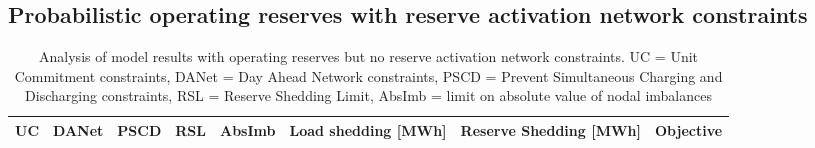 \documentclass[number,times]{elsarticle}
\begin{document}
\subsection{Probabilistic operating reserves with reserve activation network constraints}

\begin{table}[ht]
    \centering
    \footnotesize
    \begin{tabular}{cccccccc}
        \toprule
        UC  & DANet & PSCD & RSL & AbsImb & Load shedding [MWh] & Reserve Shedding [MWh] & Objective \\
        \midrule
        \bottomrule
    \end{tabular}
    \caption{Analysis of model results with operating reserves but no reserve activation network constraints. UC = Unit Commitment constraints, DANet = Day Ahead Network constraints, PSCD = Prevent Simultaneous Charging and Discharging constraints, RSL = Reserve Shedding Limit, AbsImb = limit on absolute value of nodal imbalances}\label{tab:results_no_RANet}
\end{table}
\end{document}
